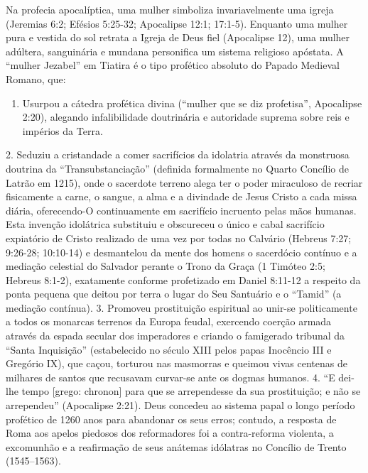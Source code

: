 Na profecia apocalíptica, uma mulher simboliza invariavelmente uma igreja (Jeremias 6:2; Efésios 5:25-32; Apocalipse 12:1; 17:1-5). Enquanto uma mulher pura e vestida do sol retrata a Igreja de Deus fiel (Apocalipse 12), uma mulher adúltera, sanguinária e mundana personifica um sistema religioso apóstata. A ``mulher Jezabel'' em Tiatira é o tipo profético absoluto do Papado Medieval Romano, que:
\begin{enumerate}
  \item Usurpou a cátedra profética divina (``mulher que se diz profetisa'', Apocalipse 2:20), alegando infalibilidade doutrinária e autoridade suprema sobre reis e impérios da Terra.
\end{enumerate}

2. Seduziu a cristandade a comer sacrifícios da idolatria através da monstruosa doutrina da ``Transubstanciação'' (definida formalmente no Quarto Concílio de Latrão em 1215), onde o sacerdote terreno alega ter o poder miraculoso de recriar fisicamente a carne, o sangue, a alma e a divindade de Jesus Cristo a cada missa diária, oferecendo-O continuamente em sacrifício incruento pelas mãos humanas. Esta invenção idolátrica substituiu e obscureceu o único e cabal sacrifício expiatório de Cristo realizado de uma vez por todas no Calvário (Hebreus 7:27; 9:26-28; 10:10-14) e desmantelou da mente dos homens o sacerdócio contínuo e a mediação celestial do Salvador perante o Trono da Graça (1 Timóteo 2:5; Hebreus 8:1-2), exatamente conforme profetizado em Daniel 8:11-12 a respeito da ponta pequena que deitou por terra o lugar do Seu Santuário e o ``Tamid'' (a mediação contínua).
3. Promoveu prostituição espiritual ao unir-se politicamente a todos os monarcas terrenos da Europa feudal, exercendo coerção armada através da espada secular dos imperadores e criando o famigerado tribunal da ``Santa Inquisição'' (estabelecido no século XIII pelos papas Inocêncio III e Gregório IX), que caçou, torturou nas masmorras e queimou vivas centenas de milhares de santos que recusavam curvar-se ante os dogmas humanos.
4. ``E dei-lhe tempo [grego: chronon] para que se arrependesse da sua prostituição; e não se arrependeu'' (Apocalipse 2:21). Deus concedeu ao sistema papal o longo período profético de 1260 anos para abandonar os seus erros; contudo, a resposta de Roma aos apelos piedosos dos reformadores foi a contra-reforma violenta, a excomunhão e a reafirmação de seus anátemas idólatras no Concílio de Trento (1545–1563).


